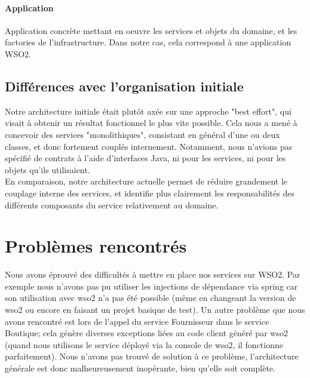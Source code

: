 \documentclass[a4paper,12pt]{article}
\begin{document}
\paragraph{Application}
Application concrète mettant en oeuvre les services et objets du domaine, et les factories de l'infrastructure.
Dans notre cas, cela correspond à une application WSO2.

\subsection{Différences avec l'organisation initiale}

Notre architecture initiale était plutôt axée sur une approche "best effort", qui visait à obtenir un résultat fonctionnel le plus vite possible. Cela nous a mené à concevoir des services "monolithiques", consistant en général d'une ou deux classes, et donc fortement couplés internement.
Notamment, nous n'avions pas spécifié de contrats à l'aide d'interfaces Java, ni pour les services, ni pour les objets qu'ils utilisaient.\\
En comparaison, notre architecture actuelle permet de réduire grandement le couplage interne des services, et identifie plus clairement les responsabilités des différents composants du service relativement au domaine.

\section{Problèmes rencontrés}

Nous avons éprouvé des difficultés à mettre en place nos services sur WSO2. Par exemple nous n'avons pas pu utiliser les injections de dépendance via spring car son utilisation avec wso2 n'a pas été possible (même en changeant la version de wso2 ou encore en faisant un projet basique de test). Un autre problème que nous avons rencontré est lors de l'appel du service Fournisseur dans le service Boutique; cela génère diverses exceptions liées au code client généré par wso2 (quand nous utilisons le service déployé via la console de wso2, il fonctionne parfaitement). Nous n'avons pas trouvé de solution à ce problème, l'architecture générale est donc malheureusement inopérante, bien qu'elle soit complète.
\end{document}
